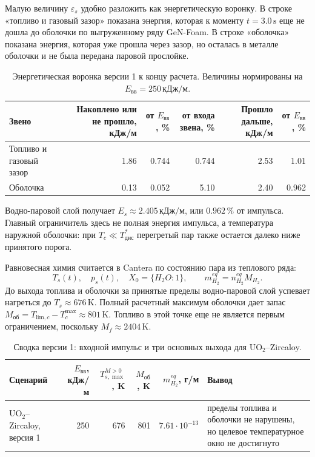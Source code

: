 Малую величину \(\varepsilon_s\) удобно разложить как энергетическую воронку. В строке «топливо и газовый зазор» показана энергия, которая к моменту \(t=3.0\,\mathrm{s}\) еще не дошла до оболочки по выгруженному ряду GeN-Foam. В строке «оболочка» показана энергия, которая уже прошла через зазор, но осталась в металле оболочки и не была передана паровой прослойке.

\begin{table}[H]
    \centering
    \caption{Энергетическая воронка версии 1 к концу расчета. Величины нормированы на \(E_{\mathrm{вв}}=250\,\mathrm{кДж/м}\).}
    \label{tab:pipelineEnergyFunnel}
    \small
    \begin{tabularx}{\textwidth}{@{}Xrrrrr@{}}
    \toprule
    Звено & Накоплено или не прошло, кДж/м & от \(E_{\mathrm{вв}}\), \% & от входа звена, \% & Прошло дальше, кДж/м & от \(E_{\mathrm{вв}}\), \% \\
    \midrule
    Топливо и газовый зазор & 1.86 & 0.744 & 0.744 & 2.53 & 1.01 \\
    Оболочка & 0.13 & 0.052 & 5.10 & 2.40 & 0.962 \\
    \bottomrule
    \end{tabularx}
\end{table}

Водно-паровой слой получает \(E_s\approx2.405\,\mathrm{кДж/м}\), или \(0.962\,\%\) от импульса. Главный ограничитель здесь не полная энергия импульса, а температура наружной оболочки: при \(T_c\ll T^*_{\mathrm{дис}}\) перегретый пар также остается далеко ниже принятого порога.

Равновесная химия считается в Cantera по состоянию пара из теплового ряда:
\[
T_s(t),\quad p_s(t),\quad X_0=\{H_2O:1\},
\qquad
m_{H_2}^{eq}=n_{H_2}^{eq}M_{H_2}.
\]
До выхода топлива и оболочки за принятые пределы водно-паровой слой успевает нагреться до \(T_s\approx676\,\mathrm{K}\). Полный расчетный максимум оболочки дает запас \(M_{\mathrm{об}}=T_{\mathrm{lim},c}-T_c^{\max}\approx801\,\mathrm{K}\). Топливо в этой точке еще не является первым ограничением, поскольку \(M_f\approx2404\,\mathrm{K}\).

\begin{table}[H]
    \centering
    \caption{Сводка версии 1: входной импульс и три основных выхода для \(\mathrm{UO_2}\)--Zircaloy.}
    \label{tab:pipelineScenarioReport}
    \small
    \begin{tabularx}{\textwidth}{@{}XrrrrX@{}}
    \toprule
    Сценарий & \(E_{\mathrm{вв}}\), кДж/м & \(T_{s,\max}^{M>0}\), K & \(M_{\mathrm{об}}\), K & \(m_{H_2}^{eq}\), г/м & Вывод \\
    \midrule
    \(\mathrm{UO_2}\)--Zircaloy, версия 1 & 250 & 676 & 801 & \(\ensuremath{7.61\cdot10^{-13}}\) & пределы топлива и оболочки не нарушены, но целевое температурное окно не достигнуто \\
    \bottomrule
    \end{tabularx}
\end{table}

